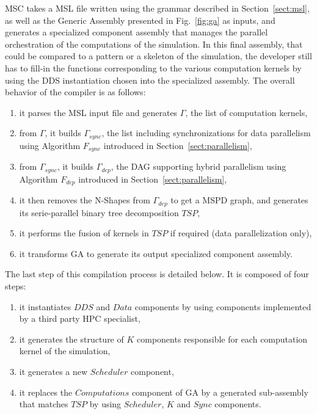 MSC takes a MSL file written using the grammar described in Section~\ref{sect:msl}, as well as the Generic Assembly presented in Fig.~\ref{fig:ga} as inputs, and generates a specialized component assembly that manages the parallel orchestration of the computations of the simulation. In this final assembly, that could be compared to a pattern or a skeleton of the simulation, the developer still has to fill-in the functions corresponding to the various computation kernels by using the DDS instantiation chosen into the specialized assembly.
The overall behavior of the compiler is as follows: %
\begin{enumerate}
 \item it parses the MSL input file and generates $\Gamma$, the list of computation kernels,
 \item from $\Gamma$, it builds $\Gamma_{sync}$, the list including synchronizations for data parallelism using Algorithm $F_{sync}$ introduced in Section~\ref{sect:parallelism},
 \item from $\Gamma_{sync}$, it builds $\Gamma_{dep}$, the DAG supporting hybrid parallelism using Algorithm $F_{dep}$ introduced in Section~\ref{sect:parallelism},
 \item it then removes the N-Shapes from $\Gamma_{dep}$ to get a MSPD graph, and generates its serie-parallel binary tree decomposition $TSP$,
 \item it performs the fusion of kernels in $TSP$ if required (data parallelization only),
 \item it transforms GA to generate its output specialized component assembly.
\end{enumerate}

The last step of this compilation process is detailed below. It is composed of four steps:
\begin{enumerate}
 \item it instantiates $DDS$ and $Data$ components by using components implemented by a third party HPC specialist,
 \item it generates the structure of $K$ components responsible for each computation kernel of the simulation,
 \item it generates a new $Scheduler$ component,
 \item it replaces the $Computations$ component of GA by a generated sub-assembly that matches $TSP$ by using $Scheduler$, $K$ and $Sync$ components.
 \end{enumerate}

